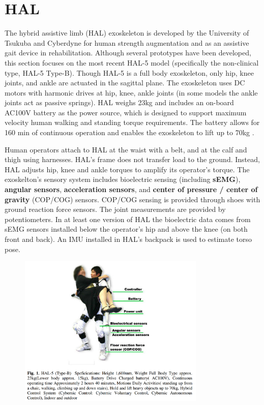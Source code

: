 \section{HAL}
\label{exo:hal}
\begin{refsection}


The hybrid assistive limb (HAL) exoskeleton is developed by the University of Tsukuba and Cyberdyne for human strength augmentation and as an assistive gait device in rehabilitation.  Although several prototypes have been developed, this section focuses on the most recent HAL-5 model (specifically the non-clinical type, HAL-5 Type-B). Though HAL-5 is a full body exoskeleton, only hip, knee joints, and ankle are actuated in the sagittal plane.  The exoskeleton uses DC motors with harmonic drives at hip, knee, ankle joints (in some models the ankle joints act as passive springs).  HAL weighs 23kg and includes an on-board AC100V battery as the power source, which is designed to support maximum velocity human walking and standing torque requirements.  The battery allows for 160 min of continuous operation and enables the exoskeleton to lift up to 70kg \cite{HALassist2011}.  

Human operators attach to HAL at the waist with a belt, and at the calf and thigh using harnesses. HAL's frame does not transfer load to the ground.  Instead, HAL adjusts hip, knee and ankle torques to amplify its operator's torque. The exoskelton's sensory system includes bioelectric sensing (including \textbf{sEMG}), \textbf{angular sensors}, \textbf{acceleration sensors}, and \textbf{center of pressure / center of gravity} (COP/COG) sensors.  COP/COG sensing is provided through shoes with ground reaction force sensors.  The joint measurements are provided by potentiometers.
In at least one version of HAL the bioelectric data comes from sEMG sensors installed below the operator's hip and above the knee (on both front and back).
An IMU installed in HAL's backpack is used to estimate torso pose.


\begin{figure}[ht]
  \centering
  \includegraphics[width=3.5in]{exos/figs/hal-5_B_diagram.png}
\end{figure}



\end{refsection}

